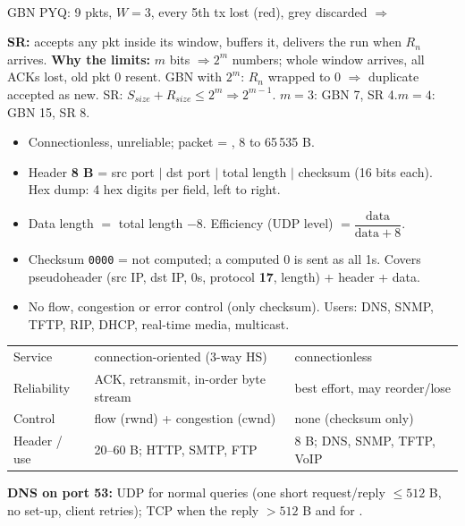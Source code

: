 \begin{multicols*}{3}
\begin{center}
\\[-1pt]
{\scriptsize GBN PYQ: 9 pkts, $W=3$, every 5th tx lost (red), grey discarded $\Rightarrow$ }
\end{center}

\textbf{SR:} accepts any pkt inside its window, buffers it, delivers the run when $R_n$ arrives.
\textbf{Why the limits:} $m$ bits $\Rightarrow 2^m$ numbers; whole window arrives, all ACKs lost, old pkt 0 resent. GBN with $2^m$: $R_n$ wrapped to 0 $\Rightarrow$ duplicate accepted as new. SR: $S_{size}+R_{size}\le 2^m \Rightarrow 2^{m-1}$.
$m=3$: GBN 7, SR 4.\quad $m=4$: GBN 15, SR 8.

 
\begin{itemize}
  \item Connectionless, unreliable; packet = , 8 to 65\,535 B.
  \item Header \textbf{8 B} = src port $|$ dst port $|$ total length $|$ checksum (16 bits each). Hex dump: 4 hex digits per field, left to right.
  \item Data length $=$ total length $-8$. Efficiency (UDP level) $=\dfrac{\text{data}}{\text{data}+8}$.
  \item Checksum \texttt{0000} = not computed; a computed 0 is sent as all 1s. Covers pseudoheader (src IP, dst IP, 0s, protocol \textbf{17}, length) + header + data.
  \item No flow, congestion or error control (only checksum). Users: DNS, SNMP, TFTP, RIP, DHCP, real-time media, multicast.
\end{itemize}
\begin{center}\scriptsize\zebra
\begin{tabularx}{\linewidth}{@{}L{13mm}YY@{}}\toprule
 &  & \\\midrule
Service & connection-oriented (3-way HS) & connectionless\\
Reliability & ACK, retransmit, in-order byte stream & best effort, may reorder/lose\\
Control & flow (rwnd) + congestion (cwnd) & none (checksum only)\\
Header / use & 20--60 B; HTTP, SMTP, FTP & 8 B; DNS, SNMP, TFTP, VoIP\\\bottomrule
\end{tabularx}
\end{center}
\textbf{DNS on port 53:} UDP for normal queries (one short request/reply $\le512$ B, no set-up, client retries); TCP when the reply $>512$ B and for .


\end{multicols*}
